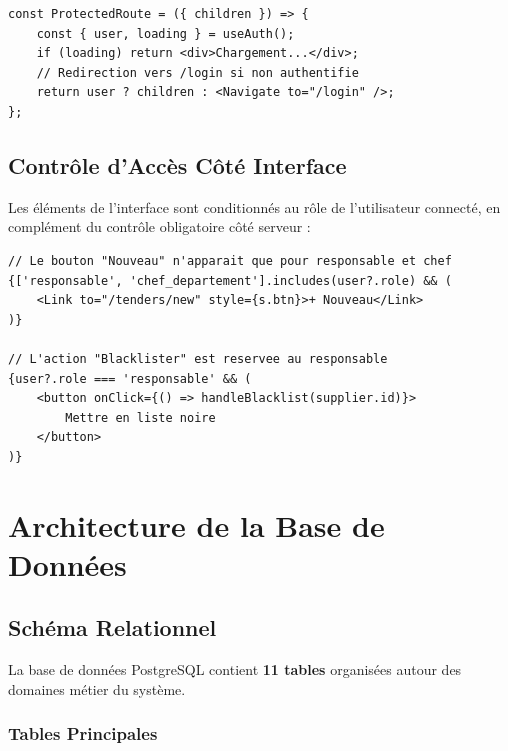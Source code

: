 \documentclass[12pt,a4paper]{report}
\begin{document}
\begin{lstlisting}[style=js, caption={App.js — Protection des routes}]
const ProtectedRoute = ({ children }) => {
    const { user, loading } = useAuth();
    if (loading) return <div>Chargement...</div>;
    // Redirection vers /login si non authentifie
    return user ? children : <Navigate to="/login" />;
};
\end{lstlisting}

\section{Contrôle d'Accès Côté Interface}

Les éléments de l'interface sont conditionnés au rôle de l'utilisateur connecté, en complément du contrôle obligatoire côté serveur :

\begin{lstlisting}[style=js, caption={Exemple — Bouton conditionnel au rôle}]
// Le bouton "Nouveau" n'apparait que pour responsable et chef
{['responsable', 'chef_departement'].includes(user?.role) && (
    <Link to="/tenders/new" style={s.btn}>+ Nouveau</Link>
)}

// L'action "Blacklister" est reservee au responsable
{user?.role === 'responsable' && (
    <button onClick={() => handleBlacklist(supplier.id)}>
        Mettre en liste noire
    </button>
)}
\end{lstlisting}

\chapter{Architecture de la Base de Données}

\section{Schéma Relationnel}

La base de données PostgreSQL contient \textbf{11 tables} organisées autour des domaines métier du système.

\subsection{Tables Principales}
\end{document}

